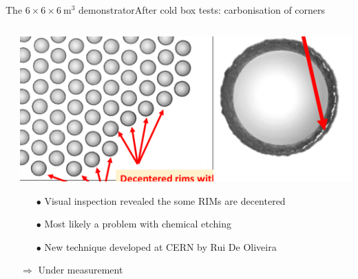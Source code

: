\documentclass[10pt]{beamer}
\begin{document}
\begin{frame}{The \texorpdfstring{$6 \times 6 \times \SI{6}{\meter\cubed}$}{666} demonstrator}{After cold box tests: carbonisation of corners}
\begin{scriptsize}
\begin{columns}
\begin{column}{0.48\textwidth}
\begin{itemize}
	       				\end{itemize}
	       			\end{column}
	       			\hfill
	       			\begin{column}{0.48\textwidth}
	       				\includegraphics[width=\textwidth]{figures/666/decentered_rims.png}\\
	       				\vfill
	       				\begin{itemize}
	       					\item[$\bullet$] Visual inspection revealed the some RIMs are decentered
	       					\item[$\bullet$] Most likely a problem with chemical etching
	       					\item[$\bullet$] New technique developed at CERN by Rui De Oliveira
	       				\end{itemize}
	       				$\Rightarrow$ Under measurement
	       			\end{column}
	       		\end{columns}
	       	\end{scriptsize}
       \end{frame}
       {
       \begin{frame}
       	
       \end{frame}
	    }
	    
\end{document}
